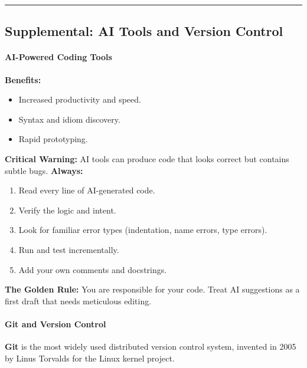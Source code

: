 \documentclass[
  justified,
  openright,
]{tufte-book}
\let\subsubsection\paragraph
\let\paragraph\paragraph
\let\subsubsection\paragraph
\let\paragraph\paragraph
\providecommand{\tightlist}{%
  \setlength{\itemsep}{0pt}\setlength{\parskip}{0pt}}
\begin{document}
\begin{center}\rule{0.5\linewidth}{0.5pt}\end{center}

\subsection{Supplemental: AI Tools and Version
Control}\label{supplemental-ai-tools-and-version-control}

\subsubsection{AI-Powered Coding Tools}\label{ai-powered-coding-tools}

\textbf{Benefits:}

\begin{itemize}
\tightlist
\item
  Increased productivity and speed.
\item
  Syntax and idiom discovery.
\item
  Rapid prototyping.
\end{itemize}

\textbf{Critical Warning:} AI tools can produce code that looks correct
but contains subtle bugs. \textbf{Always:}

\begin{enumerate}
\def\labelenumi{\arabic{enumi}.}
\tightlist
\item
  Read every line of AI-generated code.
\item
  Verify the logic and intent.
\item
  Look for familiar error types (indentation, name errors, type errors).
\item
  Run and test incrementally.
\item
  Add your own comments and docstrings.
\end{enumerate}

\textbf{The Golden Rule:} You are responsible for your code. Treat AI
suggestions as a first draft that needs meticulous editing.

\subsubsection{Git and Version Control}\label{git-and-version-control}

\textbf{Git} is the most widely used distributed version control system,
invented in 2005 by Linus Torvalds for the Linux kernel project.
\end{document}
